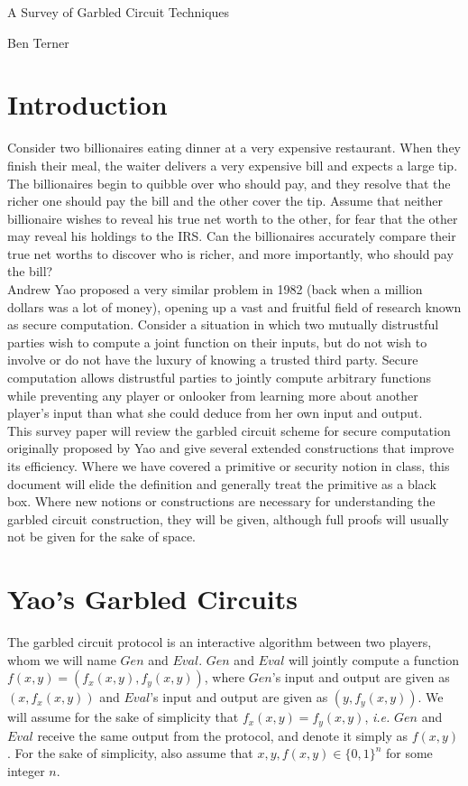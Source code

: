 \documentclass{article}
\author{\textbf{\hmwkAuthorName}}
\date{}
\begin{document}
\centerline{{\Large A Survey of Garbled Circuit Techniques}}

\centerline{{\large Ben Terner}}

\section{Introduction}
Consider two billionaires eating dinner at a very expensive restaurant. When they finish their meal, the waiter delivers a very expensive bill and expects a large tip. The billionaires begin to quibble over who should pay, and they resolve that the richer one should pay the bill and the other cover the tip. Assume that neither billionaire wishes to reveal his true net worth to the other, for fear that the other may reveal his holdings to the IRS. Can the billionaires accurately compare their true net worths to discover who is richer, and more importantly, who should pay the bill?\\

Andrew Yao proposed a very similar problem in 1982 \cite{yaoprotocols} (back when a million dollars was a lot of money), opening up a vast and fruitful field of research known as secure computation. Consider a situation in which two mutually distrustful parties wish to compute a joint function on their inputs, but do not wish to involve or do not have the luxury of knowing a trusted third party. Secure computation allows distrustful parties to jointly compute arbitrary functions while preventing any player or onlooker from learning more about another player's input than what she could deduce from her own input and output.  \\

This survey paper will review the garbled circuit scheme for secure computation originally proposed by Yao and give several extended constructions that improve its efficiency. Where we have covered a primitive or security notion in class, this document will elide the definition and generally treat the primitive as a black box. Where new notions or constructions are necessary for understanding the garbled circuit construction, they will be given, although full proofs will usually not be given for the sake of space.

\section{Yao's Garbled Circuits}

The garbled circuit protocol is an interactive algorithm between two players, whom we will name $Gen$ and $Eval$. $Gen$ and $Eval$ will jointly compute a function $f(x,y) = (f_{x}(x,y),f_{y}(x,y))$, where $Gen$'s input and output are given as $(x,f_{x}(x,y))$ and $Eval$'s input and output are given as $(y,f_{y}(x,y))$. We will assume for the sake of simplicity that $f_{x}(x,y) = f_{y}(x,y)$, \textit{i.e.} $Gen$ and $Eval$ receive the same output from the protocol, and denote it simply as $f(x,y)$. For the sake of simplicity, also assume that $x,y,f(x,y) \in \{0,1\}^{n}$ for some integer $n$. \\
\end{document}
